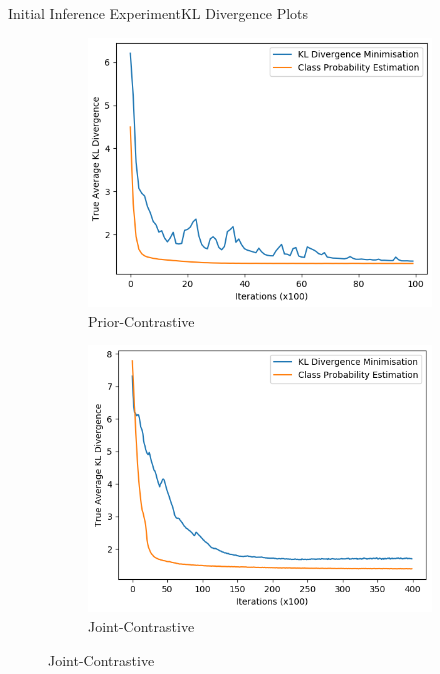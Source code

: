 \documentclass{beamer}
\begin{document}
\begin{frame}{Initial Inference Experiment}{KL Divergence Plots}
\begin{figure}
\begin{subfigure}{0.49\textwidth}
\includegraphics[width=\linewidth]{truklmins/PCKLvsPCADV.png}
\caption{Prior-Contrastive}
\end{subfigure}
\begin{subfigure}{0.49\textwidth}
\includegraphics[width=\linewidth]{truklmins/JCKLvsJCADV.png}
\caption{Joint-Contrastive}
\end{subfigure}
\end{figure}
\end{frame}
\end{document}

